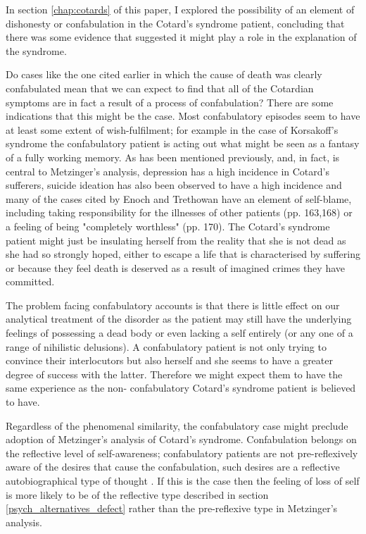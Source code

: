 In section \ref{chap:cotards} of this paper, I explored the possibility of an element of dishonesty or confabulation in the Cotard's syndrome patient, concluding that there was some evidence that suggested it might play a role in the explanation of the syndrome.

Do cases like the one cited earlier in which the cause of death was clearly confabulated mean that we can expect to find that all of the Cotardian symptoms are in fact a result of a process of confabulation? There are some indications that this might be the case. Most confabulatory episodes seem to have at least some extent of wish-fulfilment; for example in the case of Korsakoff's syndrome the confabulatory patient is acting out what might be seen as a fantasy of a fully working memory. As has been mentioned previously, and, in fact, is central to Metzinger's analysis, depression has a high incidence in Cotard's sufferers, suicide ideation has also been observed to have a high incidence and many of the cases cited by Enoch and Trethowan \cite{enoch1991} have an element of self-blame, including taking responsibility for the illnesses of other patients (pp. 163,168) or a feeling of being "completely worthless" (pp. 170). The Cotard's syndrome patient might just be insulating herself from the reality that she is not dead as she had so strongly hoped, either to escape a life that is characterised by suffering or because they feel death is deserved as a result of imagined crimes they have committed.

The problem facing confabulatory accounts is that there is little effect on our analytical treatment of the disorder as the patient may still have the underlying feelings of possessing a dead body or even lacking a self entirely (or any one of a range of nihilistic delusions). A confabulatory patient is not only trying to convince their interlocutors but also herself and she seems to have a greater degree of success with the latter. Therefore we might expect them to have the same experience as the non- confabulatory Cotard's syndrome patient is believed to have.

Regardless of the phenomenal similarity, the confabulatory case might preclude adoption of Metzinger's analysis of Cotard's syndrome. Confabulation belongs on the reflective level of self-awareness; confabulatory patients are not pre-reflexively aware of the desires that cause the confabulation, such desires are a reflective autobiographical type of thought \cite[p. 313]{metzinger2003}. If this is the case then the feeling of loss of self is more likely to be of the reflective type described in section \ref{psych_alternatives_defect} rather than the pre-reflexive type in Metzinger's analysis.

